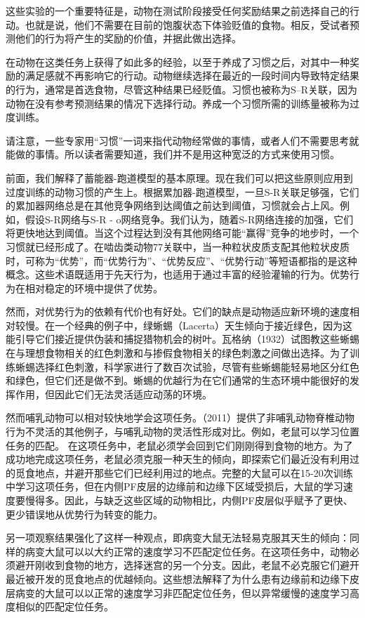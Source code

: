 这些实验的一个重要特征是，动物在测试阶段接受任何奖励结果之前选择自己的行动。也就是说，他们不需要在目前的饱腹状态下体验贬值的食物。相反，受试者预测他们的行为将产生的奖励的价值，并据此做出选择。\par
在动物在这类任务上获得了如此多的经验，以至于养成了习惯之后，对其中一种奖励的满足感就不再影响它的行动。动物继续选择在最近的一段时间内导致特定结果的行为，通常是首选食物，尽管这种结果已经贬值。习惯也被称为S–R关联，因为动物在没有参考预测结果的情况下选择行动。养成一个习惯所需的训练量被称为过度训练。\par
请注意，一些专家用“习惯”一词来指代动物经常做的事情，或者人们不需要思考就能做的事情。所以读者需要知道，我们并不是用这种宽泛的方式来使用习惯。\par
前面，我们解释了蓄能器-跑道模型的基本原理。现在我们可以把这些原则应用到过度训练的动物习惯的产生上。根据累加器-跑道模型，一旦S-R关联足够强，它们的累加器网络总是在其他竞争网络到达阈值之前达到阈值，习惯就会占上风。例如，假设S-R网络与S-R - o网络竞争。我们认为，随着S-R网络连接的加强，它们将更快地达到阈值。当这个过程达到没有其他网络可能“赢得”竞争的地步时，一个习惯就已经形成了。在啮齿类动物77关联中，当一种粒状皮质支配其他粒状皮质时，可称为“优势”，而“优势行为”、“优势反应”、“优势行动”等短语都指的是这种概念。这些术语既适用于先天行为，也适用于通过丰富的经验灌输的行为。优势行为在相对稳定的环境中提供了优势。\par
然而，对优势行为的依赖有代价也有好处。它们的缺点是动物适应新环境的速度相对较慢。在一个经典的例子中，绿蜥蜴（Lacerta）天生倾向于接近绿色，因为这能引导它们接近提供伪装和捕捉猎物机会的树叶。瓦格纳（1932）试图教这些蜥蜴在与理想食物相关的红色刺激和与掺假食物相关的绿色刺激之间做出选择。为了训练蜥蜴选择红色刺激，科学家进行了数百次试验，尽管有些蜥蜴能轻易地区分红色和绿色，但它们还是做不到。蜥蜴的优越行为在它们通常的生态环境中能很好的发挥作用，但因此它们无法灵活适应动荡的环境。\par
然而哺乳动物可以相对较快地学会这项任务。\cite{Murray et al}（2011）提供了非哺乳动物脊椎动物行为不灵活的其他例子，与哺乳动物的灵活性形成对比。例如，老鼠可以学习位置任务的匹配。
在这项任务中，老鼠必须学会回到它们刚刚得到食物的地方\cite{arighetto et al,1998}。为了成功地完成这项任务，老鼠必须克服一种天生的倾向，即探索它们最近没有利用过的觅食地点，并避开那些它们已经利用过的地点。完整的大鼠可以在15-20次训练中学习这项任务，但在内侧PF皮层的边缘前和边缘下区域受损后，大鼠的学习速度要慢得多\cite{Dias&Aggleton 2000}。因此，与缺乏这些区域的动物相比，内侧PF皮层似乎赋予了更快、更少错误地从优势行为转变的能力。\par
另一项观察结果强化了这样一种观点，即病变大鼠无法轻易克服其天生的倾向：同样的病变大鼠可以以大约正常的速度学习不匹配定位任务\cite{Dias&Aggleton 2000}。在这项任务中，动物必须避开刚收到食物的地方，选择迷宫的另一个分支。因此，老鼠不必克服它们避开最近被开发的觅食地点的优越倾向。这些想法解释了为什么患有边缘前和边缘下皮层病变的大鼠可以以正常的速度学习非匹配定位任务，但以异常缓慢的速度学习高度相似的匹配定位任务。\par
